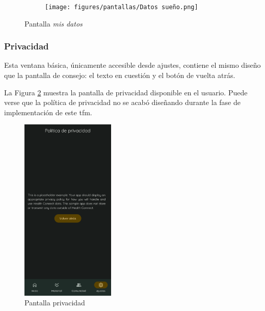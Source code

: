 \begin{figure}[htbp]
\begin{subfigure}[c]{0.4\textwidth}
                	\end{subfigure}
                	\hspace{0.1\textwidth}
                	\begin{subfigure}[c]{0.4\textwidth}
                		\centering
                		\texttt{[image: figures/pantallas/Datos sueño.png]}
                	\end{subfigure}
                	\caption{Pantalla \textit{mis datos}}
                	\label{figure:implementacion:pantalla:mis_datos}
                \end{figure}	

                \clearpage  %
            
            \subsubsection*{Privacidad}
                Esta ventana básica, únicamente accesible desde ajustes, contiene el mismo diseño que la pantalla de consejo: el texto en cuestión y el botón de vuelta atrás. 

                La Figura \ref{figure:implementacion:pantalla:privacidad} muestra la pantalla de privacidad disponible en el usuario. Puede verse que la política de privacidad no se acabó diseñando durante la fase de implementación de este \gls{tfm}. 
                
                \begin{figure}[h]
                	\centering
                	\includegraphics[width=0.4\textwidth]{figures/pantallas/Privacidad.png}
                	\caption{Pantalla privacidad}
                	\label{figure:implementacion:pantalla:privacidad}
                \end{figure}

